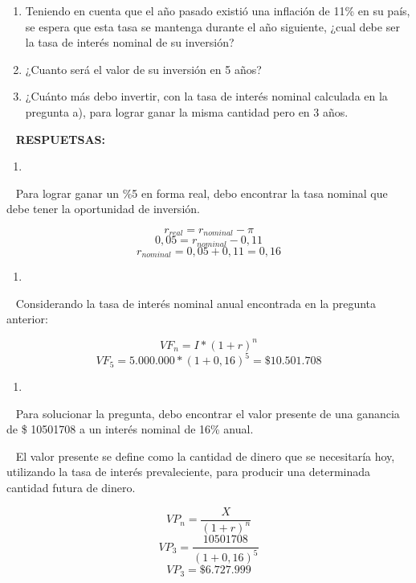 \documentclass[
  letterpaper,
  DIV=11,
  numbers=noendperiod]{scrreport}
\providecommand{\tightlist}{%
  \setlength{\itemsep}{0pt}\setlength{\parskip}{0pt}}\usepackage{longtable,booktabs,array}
\begin{document}
\begin{enumerate}
\def\labelenumi{\alph{enumi})}
\item
  Teniendo en cuenta que el año pasado existió una inflación de 11\% en
  su país, se espera que esta tasa se mantenga durante el año siguiente,
  ¿cual debe ser la tasa de interés nominal de su inversión?
\item
  ¿Cuanto será el valor de su inversión en 5 años?
\item
  ¿Cuánto más debo invertir, con la tasa de interés nominal calculada en
  la pregunta a), para lograr ganar la misma cantidad pero en 3 años.
\end{enumerate}

~ \textbf{RESPUETSAS:}

\begin{enumerate}
\def\labelenumi{\alph{enumi})}
\tightlist
\item
\end{enumerate}

~ Para lograr ganar un \%5 en forma real, debo encontrar la tasa nominal
que debe tener la oportunidad de inversión.

\[r_{real}=r_{nominal}-\pi\] \[0,05 = r_{nominal}-0,11\]
\[r_{nominal}=0,05 + 0,11=0,16\]

\begin{enumerate}
\def\labelenumi{\alph{enumi})}
\setcounter{enumi}{1}
\tightlist
\item
\end{enumerate}

~ Considerando la tasa de interés nominal anual encontrada en la
pregunta anterior:

\[{VF}_n = I*(1+r)^n\] \[{VF}_5 = 5.000.000*(1+0,16)^5 = \$10.501.708\]

\begin{enumerate}
\def\labelenumi{\alph{enumi})}
\setcounter{enumi}{2}
\tightlist
\item
\end{enumerate}

~ Para solucionar la pregunta, debo encontrar el valor presente de una
ganancia de \$ 10501708 a un interés nominal de 16\% anual.

~ El valor presente se define como la cantidad de dinero que se
necesitaría hoy, utilizando la tasa de interés prevaleciente, para
producir una determinada cantidad futura de dinero.

\[{VP}_n = \frac{X}{(1+r)^n}\] \[{VP}_3 = \frac{10501708}{(1+0,16)^5}\]
\[{VP}_3 = \$ 6.727.999\]
\end{document}
